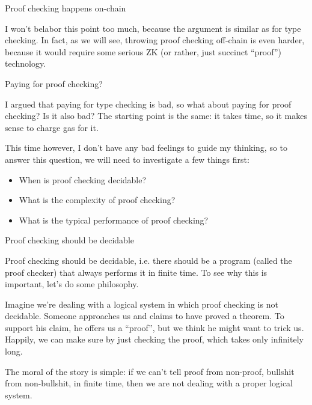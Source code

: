 \documentclass{beamer}
\begin{document}
\begin{frame}{Proof checking happens on-chain}

I won't belabor this point too much, because the argument is similar as for type checking. In fact, as we will see, throwing proof checking off-chain is even harder, because it would require some serious ZK (or rather, just succinct ``proof'') technology.

\end{frame}

\begin{frame}{Paying for proof checking?}

I argued that paying for type checking is bad, so what about paying for proof checking? Is it also bad? The starting point is the same: it takes time, so it makes sense to charge gas for it.

\vspace{2em}

This time however, I don't have any bad feelings to guide my thinking, so to answer this question, we will need to investigate a few things first:

\begin{itemize}
  \item When is proof checking decidable?
  \item What is the complexity of proof checking?
  \item What is the typical performance of proof checking?
\end{itemize}

\end{frame}

\begin{frame}{Proof checking should be decidable}

Proof checking should be decidable, i.e. there should be a program (called the proof checker) that always performs it in finite time. To see why this is important, let's do some philosophy.

\vspace{2em}

Imagine we're dealing with a logical system in which proof checking is not decidable. Someone approaches us and claims to have proved a theorem. To support his claim, he offers us a ``proof'', but we think he might want to trick us. Happily, we can make sure by just checking the proof, which takes only infinitely long.

\vspace{2em}

The moral of the story is simple: if we can't tell proof from non-proof, bullshit from non-bullshit, in finite time, then we are not dealing with a proper logical system.

\end{frame}
\end{document}
